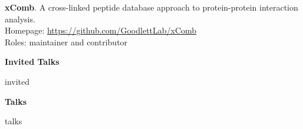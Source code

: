 \documentclass[11pt]{article}
\newcommand{\mysection}[1]{\vspace{1ex} \textbf{\large \textsf{#1} \quad \hrulefill}}
\newcommand{\myref}[1]{\href{#1}{\url{#1}}}
\begin{document}
{{\begin{etaremune}
  \item \textbf{xComb}. A cross-linked peptide database approach to
  protein-protein interaction analysis. \\
  Homepage: \myref{https://github.com/GoodlettLab/xComb} \\
  Roles: maintainer and contributor

\end{etaremune}

\mysection{Invited Talks}
\begin{etaremune}
{{ invited }}
\end{etaremune}

\mysection{Talks}
\begin{etaremune}
{{ talks }}
\end{etaremune}








}}
\end{document}
